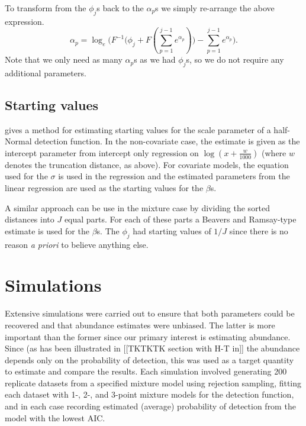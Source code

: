 To transform from the $\phi_j$s back to the $\alpha_p$s we simply re-arrange the above expression.
\begin{equation*}
\alpha_p = \log_e \Big(F^{-1}\Big(\phi_j + F(\sum_{p=1}^{j-1} e^{\alpha_p})\Big) - \sum_{p=1}^{j-1} e^{\alpha_p}\Big).
\end{equation*}
Note that we only need as many $\alpha_p$s as we had $\phi_j$s, so we do not require any additional parameters.

\subsection{Starting values}

 gives a method for estimating starting values for the scale parameter of a half-Normal detection function. In the non-covariate case, the estimate is given as the intercept parameter from intercept only regression on $\log(x+\frac{w}{1000})$ (where $w$ denotes the truncation distance, as above). For covariate models, the equation used for the $\sigma$ is used in the regression and the estimated parameters from the linear regression are used as the starting values for the $\beta$s.

A similar approach can be use in the mixture case by dividing the sorted distances into $J$ equal parts. For each of these parts a Beavers and Ramsay-type estimate is used for the $\beta$s. The $\phi_j$ had starting values of $1/J$ since there is no reason \textit{a priori} to believe anything else.

\section{Simulations}
\label{mmds-sims}

Extensive simulations were carried out to ensure that both parameters could be recovered and that abundance estimates were unbiased. The latter is more important than the former since our primary interest is estimating abundance. Since (as has been illustrated in [[TKTKTK section with H-T in]] the abundance depends only on the probability of detection, this was used as a target quantity to estimate and compare the results. Each simulation involved generating 200 replicate datasets from a specified mixture model using rejection sampling, fitting each dataset with 1-, 2-, and 3-point mixture models for the detection function, and in each case recording estimated (average) probability of detection from the model with the lowest AIC.


